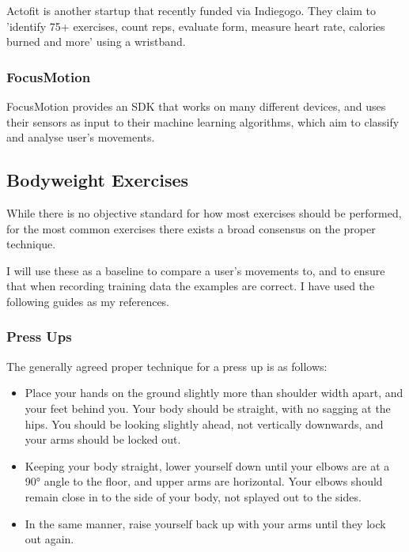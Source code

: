 \documentclass[a4paper]{article}
\begin{document}
Actofit\cite{bgref13} is another startup that recently funded via Indiegogo\cite{bgref14}. They claim to 'identify 75+ exercises, count reps, evaluate form, measure heart rate, calories burned and more' using a wristband.

\subsubsection{FocusMotion}

FocusMotion\cite{bgref15} provides an SDK that works on many different devices, and uses their sensors as input to their machine learning algorithms, which aim to classify and analyse user's movements.

\subsection{Bodyweight Exercises}%

While there is no objective standard for how most exercises should be performed, for the most common exercises there exists a broad consensus on the proper technique.

I will use these as a baseline to compare a user's movements to, and to ensure that when recording training data the examples are correct. I have used the following guides as my references.

\subsubsection{Press Ups}

The generally agreed proper technique for a press up is as follows:

\begin{itemize}
    \item Place your hands on the ground slightly more than shoulder width apart, and your feet behind you. Your body should be straight, with no sagging at the hips. You should be looking slightly ahead, not vertically downwards, and your arms should be locked out.
    \item Keeping your body straight, lower yourself down until your elbows are at a 90° angle to the floor, and upper arms are horizontal. Your elbows should remain close in to the side of your body, not splayed out to the sides.
    \item In the same manner, raise yourself back up with your arms until they lock out again.
\end{itemize}
\end{document}
